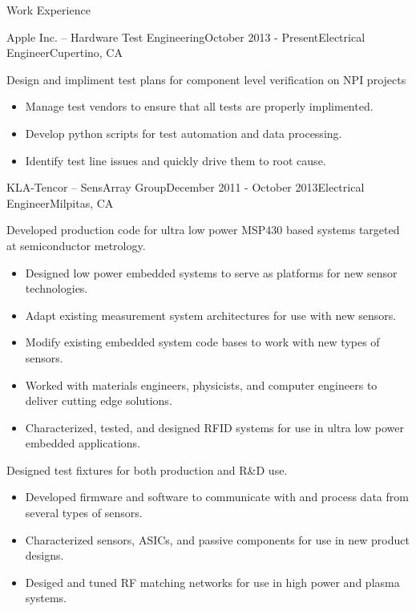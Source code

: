 \documentclass{resume} %
\begin{document}
\begin{rSection}{Work Experience}
\vspace{-0.5em}
\begin{rSubsection}{Apple Inc. -- Hardware Test Engineering}{October 2013 - Present}{Electrical Engineer}{Cupertino, CA}

\item Design and impliment test plans for component level verification on NPI projects
\begin{itemize}
\itemsep -0.5em \vspace{-0.5em}
\renewcommand{\labelitemi}{-}
\item Manage test vendors to ensure that all tests are properly implimented.
\item Develop python scripts for test automation and data processing.
\item Identify test line issues and quickly drive them to root cause.
\end{itemize}
\end{rSubsection}


\begin{rSubsection}{KLA-Tencor -- SensArray Group}{December 2011 - October 2013}{Electrical Engineer}{Milpitas, CA}
\item Developed production code for ultra low power MSP430 based systems targeted at semiconductor metrology.
\begin{itemize}
\itemsep -0.5em \vspace{-0.5em}
\renewcommand{\labelitemi}{-}
\item Designed low power embedded systems to serve as platforms for new sensor technologies.
\item Adapt existing measurement system architectures for use with new sensors.
\item Modify existing embedded system code bases to work with new types of sensors.
\item Worked with materials engineers, physicists, and computer engineers to deliver cutting edge solutions.
\item Characterized, tested, and designed RFID systems for use in ultra low power embedded applications.
\end{itemize}

\item Designed test fixtures for both production and R\&D use.
\begin{itemize}
\itemsep -0.5em \vspace{-0.5em}
\renewcommand{\labelitemi}{-}
\item Developed firmware and software to communicate with and process data from several types of sensors.
\item Characterized sensors, ASICs, and passive components for use in new product designs.
\item Desiged and tuned RF matching networks for use in high power and plasma systems.
\end{itemize}
\end{rSubsection}


\end{rSection}
\end{document}
